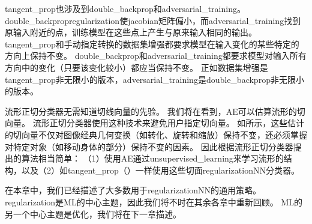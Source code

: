 
\gls{tangent_prop}也涉及到\gls{double_backprop}\citep{Drucker-LeCun-1992}和\gls{adversarial_training}\citep{Szegedy-et-al-2014b,Goodfellow-et-al-2014b}。
\gls{double_backprop}\gls{regularization}使\gls{jacobian}矩阵偏小，而\gls{adversarial_training}找到原输入附近的点，训练模型在这些点上产生与原来输入相同的输出。
\gls{tangent_prop}和手动指定转换的数据集增强都要求模型在输入变化的某些特定的方向上保持不变。
\gls{double_backprop}和\gls{adversarial_training}都要求模型对输入所有方向中的变化（只要该变化较小）都应当保持不变。
正如数据集增强是\gls{tangent_prop}非无限小的版本，\gls{adversarial_training}是\gls{double_backprop}非无限小的版本。

流形正切分类器\citep{Rifai-et-al-2011c}无需知道切线向量的先验。
我们将在看到，\gls{AE}可以估算流形的切向量。
流形正切分类器使用这种技术来避免用户指定切向量。
如所示，这些估计的切向量不仅对图像经典几何变换（如转化、旋转和缩放）保持不变，还必须掌握对特定对象（如移动身体的部分）保持不变的因素。
因此根据流形正切分类器提出的算法相当简单：
（1）使用\gls{AE}通过\gls{unsupervised_learning}来学习流形的结构，以及（2）如\gls{tangent_prop}（）一样使用这些切面\gls{regularization}\gls{NN}分类器。

在本章中，我们已经描述了大多数用于\gls{regularization}\gls{NN}的通用策略。
\gls{regularization}是\gls{ML}的中心主题，因此我们将不时在其余各章中重新回顾。
\gls{ML}的另一个中心主题是优化，我们将在下一章描述。

